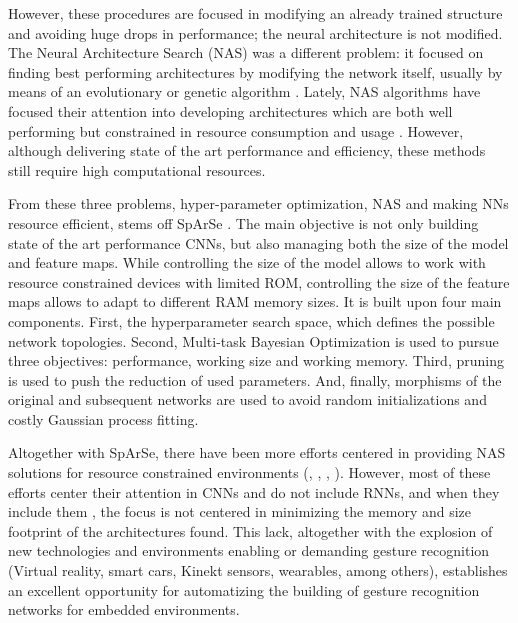 \documentclass[a4paper, twocolumn]{article}
\begin{document}
However, these procedures are focused in modifying an already trained structure and avoiding huge drops in performance; the neural architecture is not modified. The Neural Architecture Search (NAS) was a different problem: it focused on finding best performing architectures by modifying the network itself, usually by means of an evolutionary or genetic algorithm \cite{K.O.2002}. Lately, NAS algorithms have focused their attention into developing architectures which are both well performing but constrained in resource consumption and usage \cite{Elsken2018}. However, although delivering state of the art performance and efficiency, these methods still require high computational resources.

From these three problems, hyper-parameter optimization, NAS and making NNs resource efficient, stems off SpArSe \cite{Fedorov2019}. The main objective is not only building state of the art performance CNNs, but also managing both the size of the model and feature maps. While controlling the size of the model allows to work with resource constrained devices with limited ROM, controlling the size of the feature maps allows to adapt to different RAM memory sizes. It is built upon four main components. First, the hyperparameter search space, which defines the possible network topologies. Second, Multi-task Bayesian Optimization is used to pursue three objectives: performance, working size and working memory. Third, pruning is used to push the reduction of used parameters. And, finally, morphisms of the original and subsequent networks are used to avoid random initializations and costly Gaussian process fitting.

Altogether with SpArSe, there have been more efforts centered in providing NAS solutions for resource constrained environments (\cite{Loni2020}, \cite{Cai2019f}, \cite{Li2018n}, \cite{Lu2019}). However, most of these efforts center their attention in CNNs and do not include RNNs, and when they include them \cite{Pham2018}, the focus is not centered in minimizing the memory and size footprint of the architectures found. This lack, altogether with the explosion of new technologies and environments enabling or demanding gesture recognition (Virtual reality, smart cars, Kinekt sensors, wearables, among others), establishes an excellent opportunity for automatizing the building of gesture recognition networks for embedded environments.
\end{document}

